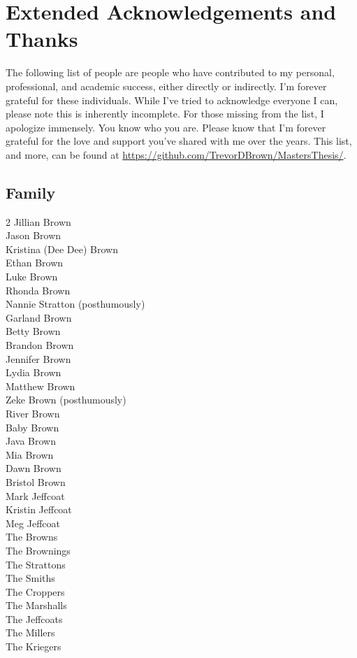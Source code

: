 \chapter{Extended Acknowledgements and Thanks}
\label{appendix:thanks}

\par The following list of people are people who have contributed to my personal, professional, and academic success, either directly or indirectly. I'm forever grateful for these individuals. While I've tried to acknowledge everyone I can, please note this is inherently incomplete. For those missing from the list, I apologize immensely. You know who you are. Please know that I'm forever grateful for the love and support you've shared with me over the years. This list, and more, can be found at \url{https://github.com/TrevorDBrown/MastersThesis/}.

\section{Family}
    \centering
    \begin{multicols}{2}
        Jillian Brown \\
        Jason Brown \\
        Kristina (Dee Dee) Brown \\
        Ethan Brown \\
        Luke Brown \\
        Rhonda Brown \\
        Nannie Stratton (posthumously) \\
        Garland Brown \\
        Betty Brown \\
        Brandon Brown \\
        Jennifer Brown \\
        Lydia Brown \\
        Matthew Brown \\
        Zeke Brown (posthumously) \\
        River Brown \\
        Baby Brown \\
        Java Brown \\
        Mia Brown \\
        Dawn Brown \\
        Bristol Brown \\
        Mark Jeffcoat \\
        Kristin Jeffcoat \\
        Meg Jeffcoat \\
        The Browns \\
        The Brownings \\
        The Strattons \\
        The Smiths \\
        The Croppers \\
        The Marshalls \\
        The Jeffcoats \\
        The Millers \\
        The Kriegers
    \end{multicols}

